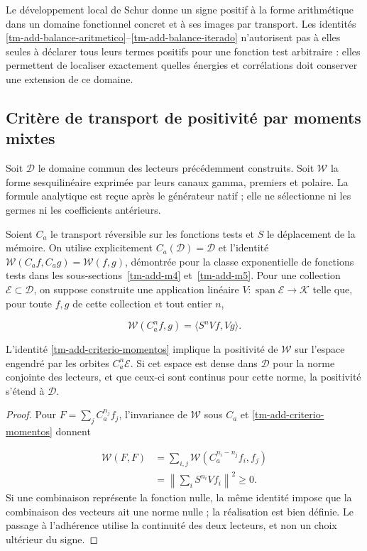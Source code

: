 

Le développement local de Schur donne un signe positif à la forme arithmétique dans un domaine fonctionnel concret et à ses images par transport. Les identités \eqref{tm-add-balance-aritmetico}–\eqref{tm-add-balance-iterado} n'autorisent pas à elles seules à déclarer tous leurs termes positifs pour une fonction test arbitraire : elles permettent de localiser exactement quelles énergies et corrélations doit conserver une extension de ce domaine.


\subsection{Critère de transport de positivité par moments mixtes}
\label{tm-add-c5}
Soit \(\mathcal D\) le domaine commun des lecteurs précédemment construits. Soit \(\mathscr W\) la forme sesquilinéaire exprimée par leurs canaux gamma, premiers et polaire. La formule analytique est reçue après le générateur natif ; elle ne sélectionne ni les germes ni les coefficients antérieurs.

Soient \(C_a\) le transport réversible sur les fonctions tests et \(S\) le déplacement de la mémoire. On utilise explicitement \(C_a(\mathcal D)=\mathcal D\) et l'identité \(\mathscr W(C_af,C_ag)=\mathscr W(f,g)\), démontrée pour la classe exponentielle de fonctions tests dans les sous-sections~\ref{tm-add-m4} et~\ref{tm-add-m5}. Pour une collection \(\mathcal E\subset\mathcal D\), on suppose construite une application linéaire \(V:\operatorname{span}\mathcal E\to\mathcal K\) telle que, pour toute \(f,g\) de cette collection et tout entier \(n\),

\begin{equation}
\boxed{\mathscr W(C_a^n f,g)=\langle S^nVf,Vg\rangle.}
\label{tm-add-criterio-momentos}
\end{equation}
\begin{proposition}
\label{tm-add-proposicion-costura-3}
L'identité \eqref{tm-add-criterio-momentos} implique la positivité de \(\mathscr W\) sur l'espace engendré par les orbites \(C_a^n\mathcal E\). Si cet espace est dense dans \(\mathcal D\) pour la norme conjointe des lecteurs, et que ceux-ci sont continus pour cette norme, la positivité s'étend à \(\mathcal D\).
\end{proposition}

\begin{proof}
Pour \(F=\sum_j C_a^{n_j}f_j\), l'invariance de \(\mathscr W\) sous \(C_a\) et \eqref{tm-add-criterio-momentos} donnent

\[
\begin{aligned}
\mathscr W(F,F)
&=\sum_{i,j}\mathscr W(C_a^{n_i-n_j}f_i,f_j)\\
&=\left\|\sum_i S^{n_i}Vf_i\right\|^2\geq0.
\end{aligned}
\]
Si une combinaison représente la fonction nulle, la même identité impose que la combinaison des vecteurs ait une norme nulle ; la réalisation est bien définie. Le passage à l'adhérence utilise la continuité des deux lecteurs, et non un choix ultérieur du signe.
\end{proof}

